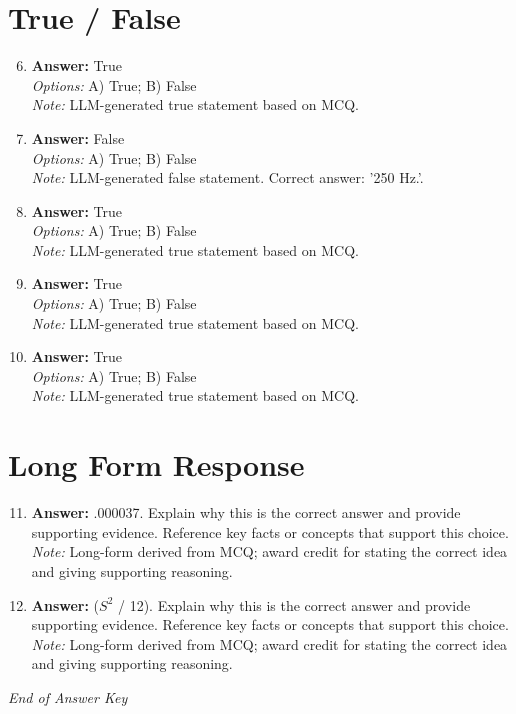 \documentclass[12pt]{article}
\begin{document}
\section*{True / False}
\begin{enumerate}[label=\arabic*.]
\setcounter{enumi}{5}
\item \textbf{Answer:} True
\\ \textit{Options:} A) True; B) False
\\ \textit{Note:} LLM-generated true statement based on MCQ.
\item \textbf{Answer:} False
\\ \textit{Options:} A) True; B) False
\\ \textit{Note:} LLM-generated false statement. Correct answer: '250 Hz.'.
\item \textbf{Answer:} True
\\ \textit{Options:} A) True; B) False
\\ \textit{Note:} LLM-generated true statement based on MCQ.
\item \textbf{Answer:} True
\\ \textit{Options:} A) True; B) False
\\ \textit{Note:} LLM-generated true statement based on MCQ.
\item \textbf{Answer:} True
\\ \textit{Options:} A) True; B) False
\\ \textit{Note:} LLM-generated true statement based on MCQ.
\end{enumerate}

\section*{Long Form Response}
\begin{enumerate}[label=\arabic*.]
\setcounter{enumi}{10}
\item \textbf{Answer:} .000037. Explain why this is the correct answer and provide supporting evidence. Reference key facts or concepts that support this choice.
\\ \textit{Note:} Long-form derived from MCQ; award credit for stating the correct idea and giving supporting reasoning.
\item \textbf{Answer:} ($S^2$ / 12). Explain why this is the correct answer and provide supporting evidence. Reference key facts or concepts that support this choice.
\\ \textit{Note:} Long-form derived from MCQ; award credit for stating the correct idea and giving supporting reasoning.
\end{enumerate}

\vfill
\noindent\textit{End of Answer Key}
\end{document}
